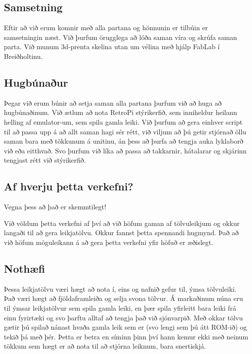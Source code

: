 \subsection{Samsetning}

Eftir að við erum komnir með alla partana og hönnunin er tilbúin er samsetningin næst. Við þurfum örugglega að lóða saman víra og skrúfa saman parta. Við munum 3d-prenta skelina utan um vélina með hjálp FabLab í Breiðholtinu.

\subsection{Hugbúnaður}

Þegar við erum búnir að setja saman alla partana þurfum við að huga að hugbúnaðinum. Við ætlum að nota RetroPi stýrikerfið, sem inniheldur heilann helling af emulator-um, sem spila gamla leiki. Við þurfum að gera einhver script til að passa upp á að allt saman hagi sér rétt, við viljum að þú getir stjórnað öllu saman bara með tökkunum á unitinu, án þess að þurfa að tengja auka lyklaborð við eða eitthvað. Svo þurfum við líka að passa að takkarnir, hátalarar og skjárinn tengjast rétt við stýrikerfið.

\subsection{Af hverju þetta verkefni?}

Vegna þess að það er skemmtilegt!

Við völdum þetta verkefni af því að við höfum gaman af tölvuleikjum og okkur langaði til að gera leikjatölvu. Okkur fannst þetta spennandi hugmynd. Það að við höfum möguleikann á að gera þetta verkefni yfir höfuð er æðislegt.

\subsection{Nothæfi}

Þessa leikjatölvu væri hægt að nota í, eins og nafnið gefur til, ýmsa tölvuleiki. Það væri hægt að fjöldaframleiða og selja svona tölvur. Á markaðinum núna eru til ýmsar leikjatölvur sem spila gamla leiki, en þær spila yfirleitt bara leiki frá einu fyrirtæki og svo þarftu alltaf að tengja það við sjónvarpið. Með okkar tölvu gætir þú spilað nánast hvaða gamla leik sem er (svo lengi sem þú átt ROM-ið) og tekið þá með þér. Þetta er betra en síminn þinn því hann kemur ekki með neinum tökkum sem hægt er að nota til að stjórna leiknum, bara snertiskjá.